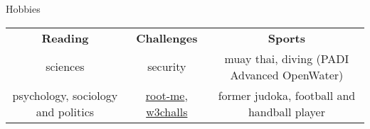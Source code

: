 \begin{rSection}{Hobbies}

  \begin{center}
      \begin{tabular}
          {c | c | c}
          \textbf{Reading} & \textbf{Challenges} & \textbf{Sports} \\
          sciences & security & muay thai, diving (PADI Advanced OpenWater) \\
          psychology, sociology and politics & \href{http://www.root-me.org/Pamplemouss_?inc=score&lang=en}{root-me}, \href{https://w3challs.com/profile/Pamplemouss_}{w3challs} & former judoka, football and handball player \\
      \end{tabular}
  \end{center}

\end{rSection}
